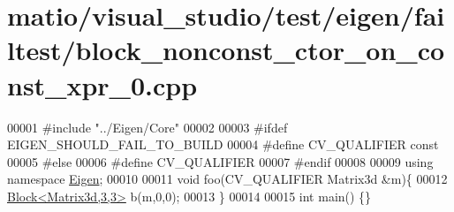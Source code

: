 \hypertarget{matio_2visual__studio_2test_2eigen_2failtest_2block__nonconst__ctor__on__const__xpr__0_8cpp_source}{}\section{matio/visual\+\_\+studio/test/eigen/failtest/block\+\_\+nonconst\+\_\+ctor\+\_\+on\+\_\+const\+\_\+xpr\+\_\+0.cpp}
\label{matio_2visual__studio_2test_2eigen_2failtest_2block__nonconst__ctor__on__const__xpr__0_8cpp_source}

\begin{DoxyCode}
00001 \textcolor{preprocessor}{#include "../Eigen/Core"}
00002 
00003 \textcolor{preprocessor}{#ifdef EIGEN\_SHOULD\_FAIL\_TO\_BUILD}
00004 \textcolor{preprocessor}{#define CV\_QUALIFIER const}
00005 \textcolor{preprocessor}{#else}
00006 \textcolor{preprocessor}{#define CV\_QUALIFIER}
00007 \textcolor{preprocessor}{#endif}
00008 
00009 \textcolor{keyword}{using namespace }\hyperlink{namespace_eigen}{Eigen};
00010 
00011 \textcolor{keywordtype}{void} foo(CV\_QUALIFIER Matrix3d &m)\{
00012     \hyperlink{group___core___module_class_eigen_1_1_block}{Block<Matrix3d,3,3>} b(m,0,0);
00013 \}
00014 
00015 \textcolor{keywordtype}{int} main() \{\}
\end{DoxyCode}
